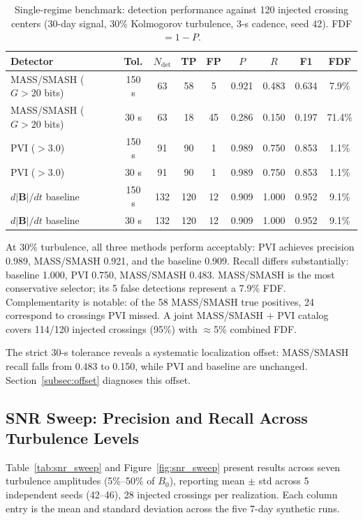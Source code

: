 \documentclass[12pt,letterpaper]{article}
\begin{document}
\begin{table}[t]
\centering
\caption{Single-regime benchmark: detection performance against 120 injected
crossing centers (30-day signal, 30\% Kolmogorov turbulence, 3-s cadence,
seed 42).
FDF $= 1 - P$.}
\label{tab:main_results}
\begin{tabular}{lcccccccc}
\toprule
Detector & Tol. & $N_\mathrm{det}$ & TP & FP & $P$ & $R$ & F1 & FDF \\
\midrule
MASS/SMASH ($G > 20$ bits) & 150 s & 63  & 58 & 5  & 0.921 & 0.483 & 0.634 & 7.9\%  \\
MASS/SMASH ($G > 20$ bits) & 30 s  & 63  & 18 & 45 & 0.286 & 0.150 & 0.197 & 71.4\% \\
\midrule
PVI ($> 3.0$)               & 150 s & 91  & 90 & 1  & 0.989 & 0.750 & 0.853 & 1.1\%  \\
PVI ($> 3.0$)               & 30 s  & 91  & 90 & 1  & 0.989 & 0.750 & 0.853 & 1.1\%  \\
\midrule
$d|\mathbf{B}|/dt$ baseline & 150 s & 132 & 120 & 12 & 0.909 & 1.000 & 0.952 & 9.1\% \\
$d|\mathbf{B}|/dt$ baseline & 30 s  & 132 & 120 & 12 & 0.909 & 1.000 & 0.952 & 9.1\% \\
\bottomrule
\end{tabular}
\end{table}

At 30\% turbulence, all three methods perform acceptably: PVI achieves
precision 0.989, MASS/SMASH 0.921, and the baseline 0.909.
Recall differs substantially: baseline 1.000, PVI 0.750, MASS/SMASH 0.483.
MASS/SMASH is the most conservative selector; its 5 false detections represent
a 7.9\% FDF.
Complementarity is notable: of the 58 MASS/SMASH true positives, 24 correspond
to crossings PVI missed.
A joint MASS/SMASH $+$ PVI catalog covers 114/120 injected crossings (95\%)
with $\approx$5\% combined FDF.

The strict 30-s tolerance reveals a systematic localization offset:
MASS/SMASH recall falls from 0.483 to 0.150, while PVI and baseline are
unchanged.
Section~\ref{subsec:offset} diagnoses this offset.

\subsection{SNR Sweep: Precision and Recall Across Turbulence Levels}
\label{subsec:snr}

Table~\ref{tab:snr_sweep} and Figure~\ref{fig:snr_sweep} present results
across seven turbulence amplitudes (5\%--50\% of $B_0$), reporting mean
$\pm$ std across 5 independent seeds (42--46), 28 injected crossings per
realization.
Each column entry is the mean and standard deviation across the five
7-day synthetic runs.
\end{document}
